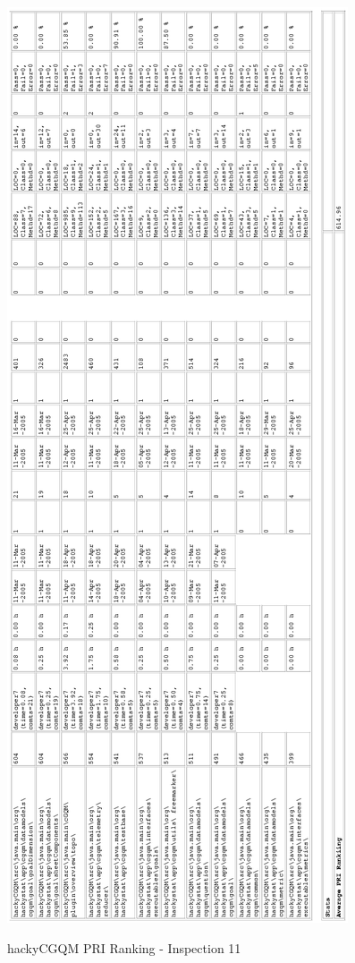 \begin{figure}[!h]
  \centering
  \caption{hackyCGQM PRI Ranking - Inspection 11}
  \includegraphics[totalheight=1.0\textheight]{figs/Results/11_2005-04-25-hackyCGQM-printable2.eps}
  \label{fig:inspection11-hackyCGQM-ranking-2}
\end{figure}


